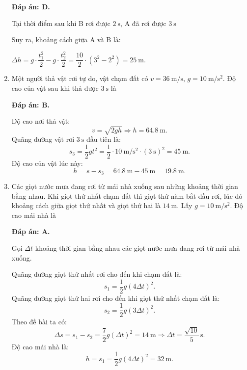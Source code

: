 \begin{enumerate}[label=\bfseries Câu \arabic*:,leftmargin=1.5cm]
{	}
	\hideall
	{	\textbf{Đáp án: D.}
		
		Tại thời điểm sau khi B rơi được $2\ \text{s}$, A đã rơi được $3\ \text{s}$
		
		Suy ra, khoảng cách giữa A và B là:
		
		$\Delta h=g\cdot\dfrac{t_1^2}{2}-g\cdot\dfrac{t_2^2}{2}=\dfrac{10}{2}\cdot \left( 3^2-2^2\right)=25\ \text{m}$.
	}
	\item {}
	
	
	{Một người thả vật rơi tự do, vật chạm đất có $v=\SI{36}{\meter/\second}$, $g=\SI{10}{\meter/\second^2}$. Độ cao của vật sau khi thả được $\SI{3}{\second}$ là
	}
	\hideall
	{	\textbf{Đáp án: B.}
		
		Độ cao nơi thả vật:
		$$v=\sqrt{2gh}\Rightarrow h = \SI{64.8}{\meter}.$$
		Quãng đường vật rơi $\SI{3}{\second}$ đầu tiên là:
		$$s_3=\dfrac{1}{2}gt^2=\dfrac{1}{2}\cdot\SI{10}{\meter/\second^2}\cdot(\SI{3}{\second})^2=\SI{45}{\meter}.$$
		Độ cao của vật lúc này:
		$$h=s-s_3=\SI{64.8}{\meter}-\SI{45}{\meter}=\SI{19.8}{\meter}.$$
	}
	\item {}
	
	
	{Các giọt nước mưa đang rơi từ mái nhà xuống sau những khoảng thời gian bằng nhau. Khi giọt thứ nhất chạm đất thì giọt thứ năm bắt đầu rơi, lúc đó khoảng cách giữa giọt thứ nhất và giọt thứ hai là $\SI{14}{\meter}$. Lấy $g=\SI{10}{\meter/\second^2}$. Độ cao mái nhà là
	}
	\hideall
	{	\textbf{Đáp án: A.}
		
		Gọi $\Delta t$ khoảng thời gian bằng nhau các giọt nước mưa đang rơi từ mái nhà xuống.
		
		Quãng đường giọt thứ nhất rơi cho đến khi chạm đất là:
		$$s_1=\dfrac{1}{2}g(4\Delta t)^2.$$
		Quãng đường giọt thứ hai rơi cho đến khi giọt thứ nhất chạm đất là:
		$$s_2=\dfrac{1}{2}g(3\Delta t)^2.$$
		Theo đề bài ta có:
		$$\Delta s= s_1-s_2=\dfrac{7}{2}g(\Delta t)^2=\SI{14}{\meter}\Rightarrow \Delta t=\dfrac{\sqrt{10}}{5}\,\text{s}.$$
		Độ cao mái nhà là:
		$$h=s_1=\dfrac{1}{2}g(4\Delta t)^2=\SI{32}{\meter}.$$
	}
	

\end{enumerate}
